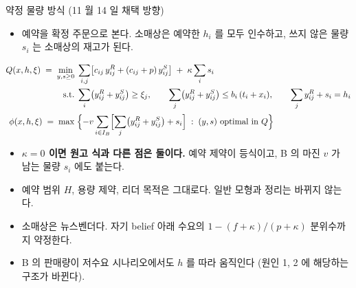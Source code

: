 \documentclass[aspectratio=169,11pt]{beamer}
\begin{document}
\begin{frame}{약정 물량 방식 (11 월 14 일 채택 방향)}
\begin{itemize}
  \item 예약을 확정 주문으로 본다. 소매상은 예약한 $h_i$ 를 모두 인수하고, 쓰지 않은 물량 $s_i$ 는 소매상의 재고가 된다.
\end{itemize}
{\small
\begin{align*}
  Q(x,h,\xi) \;=\; \min_{y,s\ge 0}\;& \sum_{i,j}\bigl[c_{ij}\,y^{R}_{ij} + (c_{ij}+p)\,y^{S}_{ij}\bigr] \;+\; \kappa\sum_{i} s_i\\
  \text{s.t.}\;& \sum_{i}\bigl(y^{R}_{ij}+y^{S}_{ij}\bigr) \ge \xi_j,\qquad
  \sum_{j}\bigl(y^{R}_{ij}+y^{S}_{ij}\bigr) \le b_i\,(t_i+x_i),\qquad
  \sum_{j} y^{R}_{ij} + s_i = h_i\\[2pt]
  \phi(x,h,\xi) \;=\; \max\;& \Bigl\{-v\sum_{i\in I_B}\Bigl[\sum_{j}\bigl(y^{R}_{ij}+y^{S}_{ij}\bigr) + s_i\Bigr] \;:\; (y,s)\ \text{optimal in } Q\Bigr\}
\end{align*}}
\begin{itemize}
  \item \textbf{$\kappa = 0$ 이면 원고 식과 다른 점은 둘이다.} 예약 제약이 등식이고, B 의 마진 $v$ 가 남는 물량 $s_i$ 에도 붙는다.
  \item 예약 범위 $H$, 용량 제약, 리더 목적은 그대로다. 일반 모형과 정리는 바뀌지 않는다.
  \item 소매상은 뉴스벤더다. 자기 belief 아래 수요의 $1 - (f+\kappa)/(p+\kappa)$ 분위수까지 약정한다.
  \item B 의 판매량이 저수요 시나리오에서도 $h$ 를 따라 움직인다 (원인 1, 2 에 해당하는 구조가 바뀐다).
\end{itemize}
\end{frame}
\end{document}
